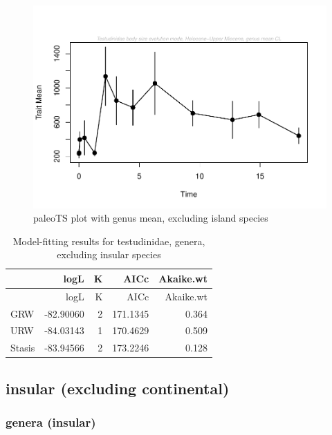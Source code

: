 \documentclass[]{article}
\begin{document}
\begin{figure}[htbp]
\centering
\includegraphics{MA_JJ_files/figure-latex/paleoTS plot with genus mean, excluding island species-1.pdf}
\caption{paleoTS plot with genus mean, excluding island species}
\end{figure}

\begin{longtable}[]{@{}lrrrr@{}}
\caption{Model-fitting results for testudinidae, genera, excluding
insular species}\tabularnewline
\toprule
& logL & K & AICc & Akaike.wt\tabularnewline
\midrule
\endfirsthead
\toprule
& logL & K & AICc & Akaike.wt\tabularnewline
\midrule
\endhead
GRW & -82.90060 & 2 & 171.1345 & 0.364\tabularnewline
URW & -84.03143 & 1 & 170.4629 & 0.509\tabularnewline
Stasis & -83.94566 & 2 & 173.2246 & 0.128\tabularnewline
\bottomrule
\end{longtable}

\newpage

\subsection{insular (excluding
continental)}\label{insular-excluding-continental}

\subsubsection{genera (insular)}\label{genera-insular}
\end{document}
